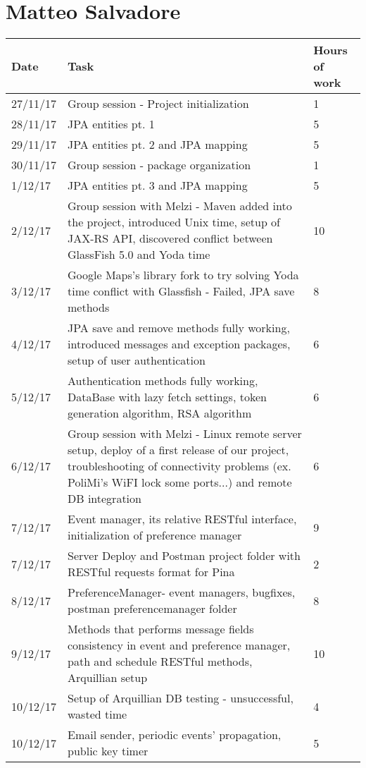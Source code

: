 \section{Matteo Salvadore}

\begin{longtable}{ p{2cm} p{10cm} p{3cm}}
	Date & Task & Hours of work\\
	\hline
	27/11/17 & Group session - Project initialization & 1 \\
	28/11/17 & JPA entities pt. 1 & 5 \\
	29/11/17 & JPA entities pt. 2 and JPA mapping & 5 \\
	30/11/17 & Group session - package organization & 1 \\
	1/12/17 & JPA entities pt. 3 and JPA mapping & 5 \\
	2/12/17 & Group session with Melzi - Maven added into the project, introduced Unix time, setup of JAX-RS API, discovered conflict between GlassFish 5.0 and Yoda time & 10 \\
	3/12/17 & Google Maps's library fork to try solving Yoda time conflict with Glassfish - Failed, JPA save methods & 8 \\
	4/12/17 & JPA save and remove methods fully working, introduced messages and exception packages, setup of user authentication & 6 \\
	5/12/17 & Authentication methods fully working, DataBase with lazy fetch settings, token generation algorithm, RSA algorithm & 6 \\
	6/12/17 & Group session with Melzi - Linux remote server setup, deploy of a first release of our project, troubleshooting of connectivity problems (ex. PoliMi's WiFI lock some ports...) and remote DB integration & 6 \\
	7/12/17 & Event manager, its relative RESTful interface, initialization of preference manager & 9 \\
	7/12/17 & Server Deploy and Postman project folder with RESTful requests format for Pina & 2 \\
	8/12/17 & PreferenceManager- event managers, bugfixes, postman preferencemanager folder & 8 \\
	9/12/17 & Methods that performs message fields consistency in event and preference manager, path and schedule RESTful methods, Arquillian setup & 10 \\
	10/12/17 & Setup of Arquillian DB testing - unsuccessful, wasted time & 4 \\
	10/12/17 & Email sender, periodic events' propagation, public key timer & 5 \\

\end{longtable}
